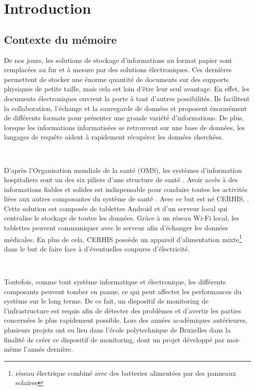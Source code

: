 \chapter{Introduction}
\section{Contexte du mémoire}

\noindent
De nos jours, les solutions de stockage d'informations au format papier sont remplacées au fur et à mesure par des solutions électroniques. Ces dernières permettent de stocker une énorme quantité de documents sur des supports physiques de petite taille, mais cela est loin d'être leur seul avantage. En effet, les documents électroniques ouvrent la porte à tant d'autres possibilités. Ils facilitent la collaboration, l'échange et la sauvegarde de données et proposent énormément de différents formats pour présenter une grande variété d'informations. De plus, lorsque les informations informatisées se retrouvent sur une base de données, les langages de requête aident à rapidement récupérer les données cherchées.

~

\noindent
D'après l'Organisation mondiale de la santé (OMS), les systèmes d'information hospitaliers sont un des six piliers d'une structure de santé \cite{world2010monitoring}. Avoir accès à des informations fiables et solides est indispensable pour conduire toutes les activités liées aux autres composantes du système de santé \cite{Mutale2013}. Avec ce but est né CERHIS, . Cette solution est composée de tablettes Android et d'un serveur local qui centralise le stockage de toutes les données. Grâce à un réseau Wi-Fi local, les tablettes peuvent communiquer avec le serveur afin d'échanger les données médicales. En plus de cela, CERHIS possède un appareil d'alimentation mixte\footnote{réseau électrique combiné avec des batteries alimentées par des panneaux solaires} dans le but de faire face à d'éventuelles coupures d'électricité.


~


\noindent
Toutefois, comme tout système informatique et électronique, les différents composants peuvent tomber en panne, ce qui peut affecter les performances du système sur le long terme. De ce fait, un dispositif de monitoring de l'infrastructure est requis afin de détecter des problèmes et d'avertir les parties concernées le plus rapidement possible. Lors des années académiques antérieures, plusieurs projets ont eu lieu dans l'école polytechnique de Bruxelles dans la finalité de créer ce dispositif de monitoring, dont un projet développé par moi-même l'année dernière.

